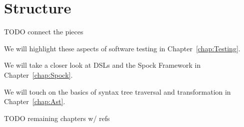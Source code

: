 \section{Structure}
TODO connect the pieces

We will highlight these aspects of software testing in Chapter~\ref{chap:Testing}.

We will take a closer look at DSLs and the Spock Framework in Chapter~\ref{chap:Spock}.

We will touch on the basics of
syntax tree traversal and transformation
in Chapter~\ref{chap:Ast}.

TODO remaining chapters w/ refs
